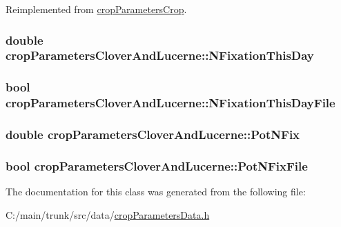 Reimplemented from \hyperlink{classcrop_parameters_crop_adfe5af221285232e8a50669ccb0c8064}{cropParametersCrop}.\hypertarget{classcrop_parameters_clover_and_lucerne_a12a88064f616d057f54a987c723c3fe8}{
\subsubsection[{NFixationThisDay}]{\setlength{\rightskip}{0pt plus 5cm}double {\bf cropParametersCloverAndLucerne::NFixationThisDay}}}
\label{classcrop_parameters_clover_and_lucerne_a12a88064f616d057f54a987c723c3fe8}
\hypertarget{classcrop_parameters_clover_and_lucerne_a8902dd60269eca0ecd9d7821b5252b5a}{
\subsubsection[{NFixationThisDayFile}]{\setlength{\rightskip}{0pt plus 5cm}bool {\bf cropParametersCloverAndLucerne::NFixationThisDayFile}}}
\label{classcrop_parameters_clover_and_lucerne_a8902dd60269eca0ecd9d7821b5252b5a}
\hypertarget{classcrop_parameters_clover_and_lucerne_a19ea02e1393a6f02186d9cf9e3fff744}{
\subsubsection[{PotNFix}]{\setlength{\rightskip}{0pt plus 5cm}double {\bf cropParametersCloverAndLucerne::PotNFix}}}
\label{classcrop_parameters_clover_and_lucerne_a19ea02e1393a6f02186d9cf9e3fff744}
\hypertarget{classcrop_parameters_clover_and_lucerne_ac95d345f85a1754a3225d1ab9b7a0145}{
\subsubsection[{PotNFixFile}]{\setlength{\rightskip}{0pt plus 5cm}bool {\bf cropParametersCloverAndLucerne::PotNFixFile}}}
\label{classcrop_parameters_clover_and_lucerne_ac95d345f85a1754a3225d1ab9b7a0145}


The documentation for this class was generated from the following file:\begin{DoxyCompactItemize}
\item 
C:/main/trunk/src/data/\hyperlink{crop_parameters_data_8h}{cropParametersData.h}\end{DoxyCompactItemize}

